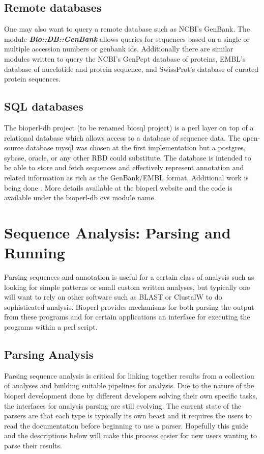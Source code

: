\documentclass{article}
\begin{document}
\subsection{Remote databases}
One may also want to query a remote database such as NCBI's GenBank.
The module \emph{\bf Bio::DB::GenBank} allows queries for sequences
based on a single or multiple accession numbers or genbank ids.
Additionally there are similar modules written to query the NCBI's
GenPept database of proteins, EMBL's database of nucelotide and
protein sequence, and SwissProt's database of curated protein sequences.

\subsection{SQL databases}

The bioperl-db project (to be renamed biosql project) is a perl layer
on top of a relational database which allows access to a database of
sequence data.  The open-source database mysql was
chosen at the first implementation but a postgres, sybase, oracle, or
any other RBD could substitute.  The database is intended to be able
to store and fetch sequences and effectively represent annotation and
related information as rich as the GenBank/EMBL format.  Additional
work is being done .  More details available at the bioperl website
and the code is available under the bioperl-db cvs module name. 

\section{Sequence Analysis: Parsing and Running}

Parsing sequences and annotation is useful for a certain class of
analysis such as looking for simple patterns or small custom written
analyses, but typically one will want to rely on other software such
as BLAST or ClustalW to do sophisticated analysis.  Bioperl provides
mechanisms for both parsing the output from these programs and for
certain applications an interface for executing the programs within a
perl script.

\subsection{Parsing Analysis}

Parsing sequence analysis is critical for linking together results
from a collection of analyses and building suitable pipelines for
analysis.  Due to the nature of the bioperl development done by
different developers solving their own specific tasks, the interfaces
for analysis parsing are still evolving.  The current state of the
parsers are that each type is typically its own beast and it requires
the users to read the documentation before beginning to use a parser.
Hopefully this guide and the descriptions below will make this process
easier for new users wanting to parse their results.
  
\end{document}
